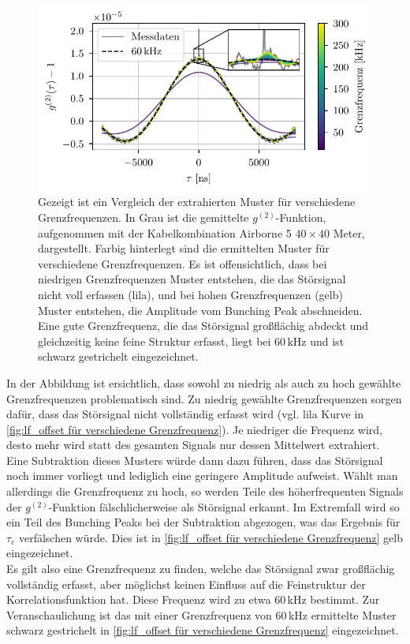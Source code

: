 \begin{figure}[h]
    \centering
    \includegraphics{images/Analysis/lf_offset.pdf}
    \caption{Gezeigt ist ein Vergleich der extrahierten Muster für verschiedene Grenzfrequenzen. In Grau ist die gemittelte $g^{(2)}$-Funktion, aufgenommen mit der Kabelkombination Airborne 5 $40\times 40$ Meter, dargestellt. Farbig hinterlegt sind die ermittelten Muster für verschiedene Grenzfrequenzen. Es ist offensichtlich, dass bei niedrigen Grenzfrequenzen Muster entstehen, die das Störsignal nicht voll erfassen (lila), und bei hohen Grenzfrequenzen (gelb) Muster entstehen, die Amplitude vom Bunching Peak abschneiden. Eine gute Grenzfrequenz, die das Störsignal großflächig abdeckt und gleichzeitig keine feine Struktur erfasst, liegt bei 60\,kHz und ist schwarz gestrichelt eingezeichnet.}
    \label{fig:lf_offset für verschiedene Grenzfrequenz}
\end{figure}
In der Abbildung ist ersichtlich, dass sowohl zu niedrig als auch zu hoch gewählte Grenzfrequenzen problematisch sind. 
Zu niedrig gewählte Grenzfrequenzen sorgen dafür, dass das Störsignal nicht vollständig erfasst wird (vgl. lila Kurve in \autoref{fig:lf_offset für verschiedene Grenzfrequenz}). 
Je niedriger die Frequenz wird, desto mehr wird statt des gesamten Signals nur dessen Mittelwert extrahiert. 
Eine Subtraktion dieses Musters würde dann dazu führen, dass das Störsignal noch immer vorliegt und lediglich eine geringere Amplitude aufweist. 
Wählt man allerdings die Grenzfrequenz zu hoch, so werden Teile des höherfrequenten Signals der $g^{(2)}$-Funktion fälschlicherweise als Störsignal erkannt. 
Im Extremfall wird so ein Teil des Bunching Peaks bei der Subtraktion abgezogen, was das Ergebnis für $\tau_{\mathrm{c}}$ verfälschen würde. 
Dies ist in \autoref{fig:lf_offset für verschiedene Grenzfrequenz} gelb eingezeichnet. \\
Es gilt also eine Grenzfrequenz zu finden, welche das Störsignal zwar großflächig vollständig erfasst, aber möglichst keinen Einfluss auf die Feinstruktur der Korrelationsfunktion hat. 
Diese Frequenz wird zu etwa 60\,kHz bestimmt. 
Zur Veranschaulichung ist das mit einer Grenzfrequenz von 60\,kHz ermittelte Muster schwarz gestrichelt in \autoref{fig:lf_offset für verschiedene Grenzfrequenz} eingezeichnet. \\

